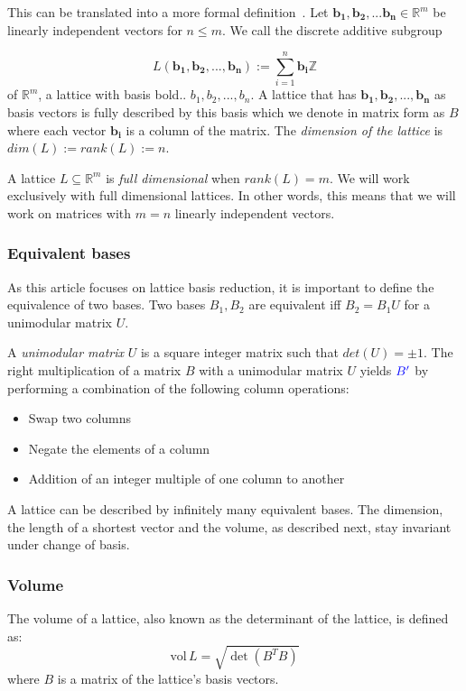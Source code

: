 \documentclass[10pt, a4paper]{article}
\newcommand{\my}[1]{{\color{blue} #1 }}
\renewcommand{\vec}[1]{\mathbf{#1}}
\begin{document}
This can be translated into a more formal definition~\cite{SchnorrStanfordNotes}.\newline 
Let $\vec{b_1}, \vec{b_2}, ... \vec{b_n} \in \mathbb{R}^m$ be linearly independent vectors for $n\leq m$. We call the \my{discrete} additive subgroup

\[
L(\vec{b_1}, \vec{b_2},..., \vec{b_n}):= \displaystyle\sum_{i=1}^{n} \vec{b_i} \mathbb{Z}
\] of $\mathbb{R}^m$, a lattice with basis \my{ bold..}$b_1,b_2,...,b_n$.
A lattice that has $\vec{b_1},\vec{b_2},...,\vec{b_n}$ as basis vectors \my{is fully described by this basis which we denote} in matrix form as $B$ where each vector $\vec{b_i}$ is a column of the matrix.
The \emph{dimension of the lattice} is $dim(L) := rank(L) := n$.

A lattice $L \subseteq \mathbb{R}^m$ is \emph{full dimensional} when $rank(L)=m$. We will work exclusively with full dimensional lattices. In other words, this means that we will work on matrices with $m=n$ linearly independent vectors.

\subsubsection{Equivalent bases}

As this article focuses on lattice basis reduction, it is important to define the equivalence of two bases. Two bases $B_1 , B_2$ are equivalent iff $B_2 = B_1 U$ for a unimodular matrix $U$.

A \emph{unimodular matrix} $U$ is a square integer matrix such that $det(U) = \pm 1$. The right multiplication of a matrix $B$ with a unimodular matrix $U$ yields $\my{B'}$ by performing a combination of the following column operations:
\begin{itemize}
\item Swap two columns
\item Negate the elements of a column
\item Addition of an integer multiple of one column to another
\end{itemize}

A lattice can be described by infinitely many equivalent bases. The dimension, the length of a shortest vector and the volume, as described next, stay invariant under change of basis.
\subsubsection{Volume}

The volume of a lattice, also known as the determinant of the lattice, is defined as:
\[
\text{vol} \,L = \sqrt{\det(B^T B)}
\] where $B$ is a matrix of the lattice's basis vectors.
\end{document}

